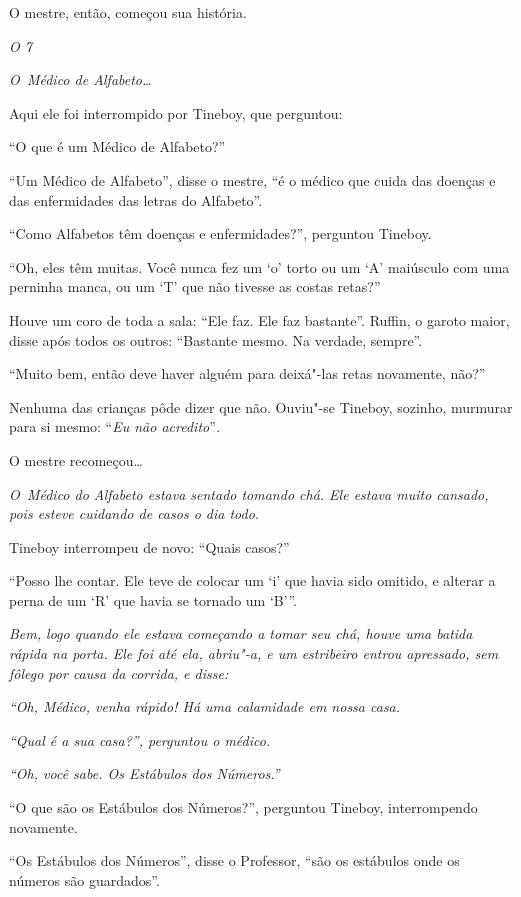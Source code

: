 O mestre, então, começou sua história.

\emph{ O  7  }


\emph{O~Médico de Alfabeto…}

Aqui ele foi interrompido por Tineboy, que perguntou:

``O que é um Médico de Alfabeto?''

``Um Médico de Alfabeto'', disse o mestre, ``é o médico que cuida das
doenças e das enfermidades das letras do Alfabeto''.

``Como Alfabetos têm doenças e enfermidades?'', perguntou Tineboy.

``Oh, eles têm muitas. Você nunca fez um `o' torto ou um `A' maiúsculo
com uma perninha manca, ou um `T' que não tivesse as costas retas?''

Houve um coro de toda a sala: ``Ele faz. Ele faz bastante''. Ruffin, o
garoto maior, disse após todos os outros: ``Bastante mesmo. Na verdade,
sempre''.

``Muito bem, então deve haver alguém para deixá"-las retas novamente,
não?''

Nenhuma das crianças pôde dizer que não. Ouviu"-se Tineboy, sozinho,
murmurar para si mesmo: ``\emph{Eu não acredito}''\emph{.}

O mestre recomeçou…

\emph{O~Médico do Alfabeto estava sentado tomando chá. Ele estava muito
cansado, pois esteve cuidando de casos o dia todo.}

Tineboy interrompeu de novo: ``Quais casos?''

``Posso lhe contar. Ele teve de colocar um `i' que havia sido omitido, e
alterar a perna de um `R' que havia se tornado um `B'''.

\emph{Bem, logo quando ele estava começando a tomar seu chá, houve uma
batida rápida na porta. Ele foi até ela, abriu"-a, e um estribeiro entrou
apressado, sem fôlego por causa da corrida, e disse:}

\emph{``Oh, Médico, venha rápido! Há uma calamidade em nossa casa.}

\emph{``Qual é a sua casa?'', perguntou o médico.}

\emph{``Oh, você sabe. Os Estábulos dos Números.''}

``O que são os Estábulos dos Números?'', perguntou Tineboy,
interrompendo novamente.

``Os Estábulos dos Números'', disse o Professor, ``são os estábulos onde
os números são guardados''.

